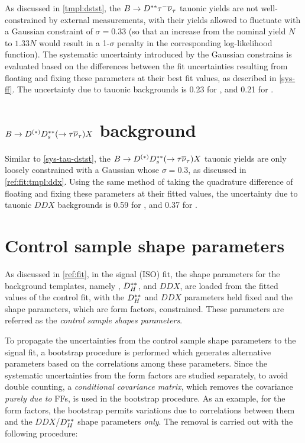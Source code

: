 As discussed in \cref{tmpl:dstst},
the $B \rightarrow D^{**} {\tau^-}{{\overline{\nu}}_\tau}$ tauonic yields are not well-constrained
by external measurements,
with their yields allowed to fluctuate with a Gaussian constraint of
$\sigma = 0.33$
(so that an increase from the nominal yield $N$ to $1.33N$ would result in a
1-$\sigma$ penalty in the corresponding log-likelihood function).
The systematic uncertainty introduced by the Gaussian constrains
is evaluated based on the differences between the fit uncertainties resulting
from floating and fixing these parameters at their best fit values,
as described in \cref{sys-ff}.
The uncertainty due to tauonic \Dstst backgrounds is 0.23 for \RD,
and 0.21 for \RDst.



\section{$B \rightarrow D^{(*)} D^{**}_s (\rightarrow \tau{\ensuremath{{\overline{\nu}}_\tau}}) X$ background}
\label{sys-tau-ddx}

Similar to \cref{sys-tau-dstst},
the $B \rightarrow D^{(*)} D^{**}_s (\rightarrow \tau{\ensuremath{{\overline{\nu}}_\tau}}) X$ tauonic yields
are only loosely constrained with a Gaussian whose $\sigma = 0.3$,
as discussed in \cref{ref:fit:tmpl:ddx}.
Using the same method of taking the quadrature difference of floating and fixing
these parameters at their fitted values,
the uncertainty due to tauonic $DDX$ backgrounds is 0.59 for \RD,
and 0.37 for \RDst.



\section{Control sample shape parameters}
\label{sys-model-ctrl}

As discussed in \cref{ref:fit},
in the signal (ISO) fit,
the shape parameters for the background templates,
namely \Dstst, $D^{**}_H$, and $DDX$,
are loaded from the fitted values of the control fit,
with the $D^{**}_H$ and $DDX$ parameters held fixed and the \Dstst
shape parameters,
which are form factors,
constrained.
These parameters are referred as the
\emph{control sample shapes parameters}.

To propagate the uncertainties from the control sample shape parameters to
the signal fit,
a bootstrap procedure is performed which generates alternative parameters based
on the correlations among these parameters.
Since the systematic uncertainties from the \Dstst form factors are
studied separately,
to avoid double counting,
a \emph{conditional covariance matrix},
which removes the covariance \emph{purely due to} \Dstst FFs,
is used in the bootstrap procedure.
As an example,
for the \Dstst form factors,
the bootstrap permits variations due to
correlations between them and the $DDX$/$D^{**}_H$ shape parameters \emph{only}.
The removal is carried out with the following procedure:

